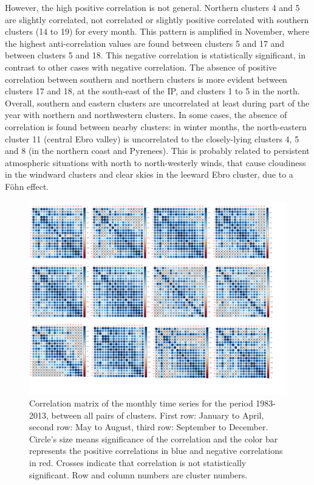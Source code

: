 \begin{subappendices}
However, the high positive correlation is not general. Northern clusters 4 and 5 are slightly correlated, not correlated or slightly positive correlated with southern clusters (14 to 19) for every month. This pattern is amplified in November, where the highest anti-correlation values are found between clusters 5 and 17 and between clusters 5 and 18. This negative correlation is statistically significant, in contrast to other cases with negative correlation. The absence of positive correlation between southern and northern clusters is more evident between clusters 17 and 18, at the south-east of the IP, and clusters 1 to 5 in the north. Overall, southern and eastern clusters are uncorrelated at least during part of the year with northern and northwestern clusters. In some cases, the absence of correlation is found between nearby clusters: in winter months, the north-eastern cluster 11 (central Ebro valley) is uncorrelated to the closely-lying clusters 4, 5 and 8 (in the northern coast and Pyrenees). This is probably related to persistent atmospheric situations with north to north-westerly winds, that cause cloudiness in the windward clusters and clear skies in the leeward Ebro cluster, due to a Föhn effect.


\begin{figure} [h!]
\includegraphics[scale=0.6]{figs/capitulo5/correlaciones_30.pdf}
\caption[Correlation matrix between clusters over the Iberain Peninsula]{Correlation matrix of the monthly time series for the period 1983-2013, between all pairs of clusters. First row: January to April, second row: May to August, third row: September to December. Circle’s size means significance of the correlation and the color bar represents the positive correlations in blue and negative correlations in red. Crosses indicate that correlation is not statistically significant. Row and column numbers are cluster numbers.}
\label{correlaciones_30}
\end{figure}


\end{subappendices}
